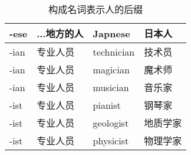 \documentclass[UTF8]{ctexart}
\begin{document}
\begin{table}[h!]
\begin{center}
\begin{tabular}{p{40pt}|p{80pt}|p{80pt}|p{80pt}}
                -ese&...地方的人&Japnese&日本人\\ \hline
                -ian&专业人员&technician&技术员\\ \hline
                -ian&专业人员&magician&魔术师\\ \hline
                -ian&专业人员&musician&音乐家\\ \hline
                -ist&专业人员&pianist&钢琴家\\ \hline
                -ist&专业人员&geologist&地质学家\\ \hline
                -ist&专业人员&physicist&物理学家\\ \hline
            \end{tabular}
            \rmfamily
            \caption{构成名词表示人的后缀}
        \end{center}
    \end{table}

\newpage
\end{document}
